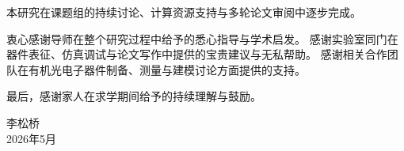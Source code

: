 本研究在课题组的持续讨论、计算资源支持与多轮论文审阅中逐步完成。

衷心感谢导师在整个研究过程中给予的悉心指导与学术启发。
感谢实验室同门在器件表征、仿真调试与论文写作中提供的宝贵建议与无私帮助。
感谢相关合作团队在有机光电子器件制备、测量与建模讨论方面提供的支持。

最后，感谢家人在求学期间给予的持续理解与鼓励。

\vspace{2em}
\noindent
{李松桥}\\
{2026年5月}

